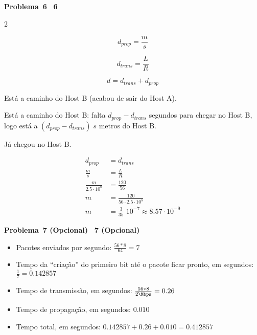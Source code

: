 \documentclass{article}
\newcounter{exe-list}
\newenvironment{exe-list}
    {\begin{list}{\alph{exe-list}.}{\usecounter{exe-list}}}
    {\end{list}}
\newenvironment{exe}[2][]
    {\newcommand{\opt}{(Opcional)}%
    \newcommand{\sketch}[1]{{\bfseries Rascunho:} ##1}%
    \newcommand{\nop}{\hspace{-1ex}}%
    \medskip\par\noindent\ifthenelse{\equal{#1}{}}
        {\textbf{\large Problema~#2}}
        {\textbf{\large #1~#2}}%
    \medskip\par\noindent}
    {\medskip}
\begin{document}
\newpage
\begin{exe}{6}
    \begin{multicols}{2}
    \begin{exe-list}
    \item \[ d_{prop} = \frac{m}{s} \]
    \item \[ d_{trans} = \frac{L}{R} \]
    \item \[ d = d_{trans} + d_{prop} \]
    \item Está a caminho do Host B (acabou de sair do Host A).
    \item Está a caminho do Host B:
        falta \(d_{prop} - d_{trans}\) segundos para chegar no Host B,
        logo está a \((d_{prop} - d_{trans}) \; s\) metros do Host B.
    \item Já chegou no Host B.
    \item \begin{align*}
            d_{prop} &= d_{trans} \\
            \frac{m}{s} &= \frac{L}{R} \\
            \frac{m}{2.5 \cdot 10^8} &= \frac{120}{56} \\
            m &= \frac{120}{56 \cdot 2.5 \cdot 10^8} \\
            m &= \frac{3}{35} \; 10^{-7} \approx 8.57 \cdot 10^{-9}
        \end{align*}
    \end{exe-list}
    \end{multicols}
\end{exe}

\begin{exe}{7 \opt}
    \begin{itemize}
        \item Pacotes enviados por segundo:
            \( \frac{56 * 8}{64} = 7 \)
        \item Tempo da ``criação'' do primeiro bit
            até o pacote ficar pronto, em segundos:
            \( \frac{1}{7} = 0.142857 \)
        \item Tempo de transmissão, em segundos:
            \( \frac{56 * 8}{2 \Mbps} = 0.26 \)
        \item Tempo de propagação, em segundos:
            \( 0.010 \)
        \item Tempo total, em segundos:
            \( 0.142857 + 0.26 + 0.010 = 0.412857 \)
    \end{itemize}
\end{exe}
\end{document}
